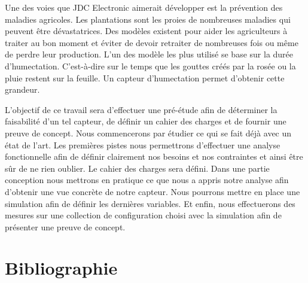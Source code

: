 \documentclass[a4paper, french, 10pt]{article} %
\begin{document}
Une des voies que JDC Electronic aimerait développer est la prévention des maladies agricoles. Les plantations sont les proies de nombreuses maladies qui peuvent être dévastatrices. Des modèles existent pour aider les agriculteurs à traiter au bon moment et éviter de devoir retraiter de nombreuses fois ou même de perdre leur production. L'un des modèle les plus utilisé \cite{doi:10.1094/PDIS-05-14-0529-FE}  se base sur la durée d'humectation. C'est-à-dire sur le temps que les gouttes créés par la rosée ou la pluie restent sur la feuille. Un capteur d'humectation permet d'obtenir cette grandeur.

L'objectif de ce travail sera d'effectuer une pré-étude afin de déterminer la faisabilité d'un tel capteur, de définir un cahier des charges et de fournir une preuve de concept. Nous commencerons par étudier ce qui se fait déjà avec un état de l'art. Les premières pistes nous permettrons d'effectuer une analyse fonctionnelle afin de définir clairement nos besoins et nos contraintes et ainsi être sûr de ne rien oublier. Le cahier des charges sera défini. Dans une partie conception nous mettrons en pratique ce que nous a appris notre analyse afin d'obtenir une vue concrète de notre capteur. Nous pourrons mettre en place une simulation afin de définir les dernières variables. Et enfin, nous effectuerons des mesures sur une collection de configuration choisi avec la simulation afin de présenter une preuve de concept.














\section{Bibliographie}

\printbibliography
\end{document}
